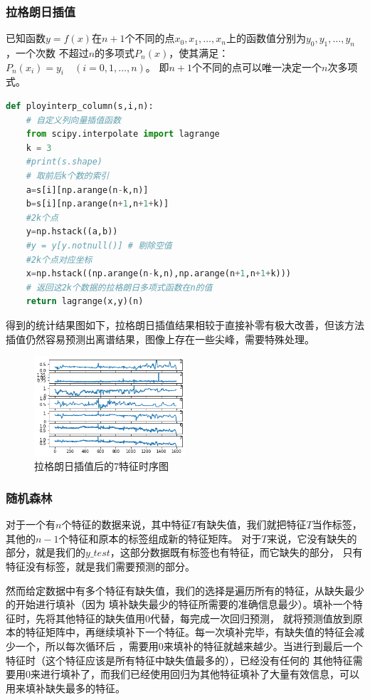 \documentclass[11pt,a4paper]{elegantpaper}
\begin{document}
\begin{multicols}{2}
\subsubsection{拉格朗日插值}

已知函数$y=f(x)$在$n+1$个不同的点$x_0 ,x_1 ,\dots ,x_n$上的函数值分别为$y_0, y_1, \dots,y_n$，一个次数
不超过$n$的多项式$P_n(x)$，使其满足： $P_n(x_i)=y_i\quad (i=0,1,\dots,n)$。
即$n+1$个不同的点可以唯一决定一个$n$次多项式。

\begin{lstlisting}[language=Python]
def ployinterp_column(s,i,n):
    # 自定义列向量插值函数
    from scipy.interpolate import lagrange
    k = 3
    #print(s.shape)
    # 取前后k个数的索引
    a=s[i][np.arange(n-k,n)]
    b=s[i][np.arange(n+1,n+1+k)]
    #2k个点
    y=np.hstack((a,b))
    #y = y[y.notnull()] # 剔除空值
    #2k个点对应坐标
    x=np.hstack((np.arange(n-k,n),np.arange(n+1,n+1+k)))
    # 返回这2k个数据的拉格朗日多项式函数在n的值
    return lagrange(x,y)(n)
\end{lstlisting}

得到的统计结果图如下，拉格朗日插值结果相较于直接补零有极大改善，但该方法插值仍然容易预测出离谱结果，图像上存在一些尖峰，需要特殊处理。

\begin{figure}[H]
  \centering
  \includegraphics[width=0.5\textwidth]{images/LLL.png}
  \caption{拉格朗日插值后的7特征时序图}
\end{figure}


\subsubsection{随机森林}

对于一个有$n$个特征的数据来说，其中特征$T$有缺失值，我们就把特征$T$当作标签，
其他的$n-1$个特征和原本的标签组成新的特征矩阵。
对于$T$来说，它没有缺失的部分，就是我们的$y\_test$，这部分数据既有标签也有特征，而它缺失的部分，
只有特征没有标签，就是我们需要预测的部分。

然而给定数据中有多个特征有缺失值，我们的选择是遍历所有的特征，从缺失最少的开始进行填补（因为
填补缺失最少的特征所需要的准确信息最少）。填补一个特征时，先将其他特征的缺失值用0代替，每完成一次回归预测，
就将预测值放到原本的特征矩阵中，再继续填补下一个特征。每一次填补完毕，有缺失值的特征会减少一个，所以每次循环后
，需要用0来填补的特征就越来越少。当进行到最后一个特征时（这个特征应该是所有特征中缺失值最多的），已经没有任何的
其他特征需要用0来进行填补了，而我们已经使用回归为其他特征填补了大量有效信息，可以用来填补缺失最多的特征。


\end{multicols}
\end{document}
